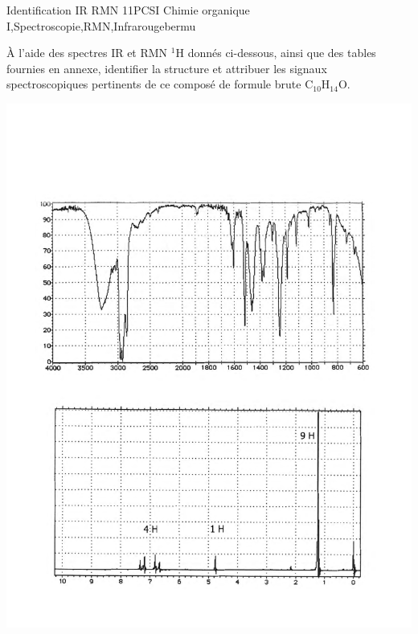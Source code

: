 
\begin{exercise}{Identification IR RMN 1}{1}{PCSI}
{Chimie organique I,Spectroscopie,RMN,Infrarouge}{bermu}

À l'aide des spectres IR et RMN $^{1}$H donnés ci-dessous, ainsi que des tables fournies en annexe, identifier la structure et attribuer les signaux spectroscopiques pertinents de ce composé de formule brute $\mathrm{C_{10}H_{14}O}$.
 
\vspace{2em}
 
\includegraphics[width=\linewidth]{chimiePC/orga/IR_RMN_1.pdf}

\end{exercise}

\begin{solution}
\begin{center}
\end{center}
\end{solution}

